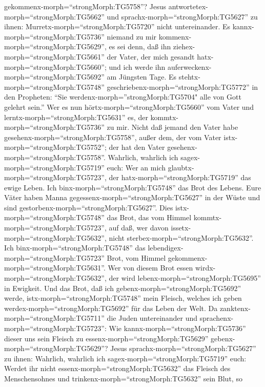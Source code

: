 gekommenx-morph=``strongMorph:TG5758''?  Jesus
antwortetex-morph=``strongMorph:TG5662'' und
sprachx-morph=``strongMorph:TG5627'' zu ihnen:
Murretx-morph=``strongMorph:TG5720'' nicht untereinander. 
Es kannx-morph=``strongMorph:TG5736'' niemand zu mir
kommenx-morph=``strongMorph:TG5629'', es sei denn, daß ihn
ziehex-morph=``strongMorph:TG5661'' der Vater, der mich gesandt
hatx-morph=``strongMorph:TG5660''; und ich werde ihn
auferweckenx-morph=``strongMorph:TG5692'' am Jüngsten Tage.
 Es stehtx-morph=``strongMorph:TG5748''
geschriebenx-morph=``strongMorph:TG5772'' in den Propheten: ``Sie
werdenx-morph=''strongMorph:TG5704" alle von Gott gelehrt sein.'' Wer es
nun hörtx-morph=``strongMorph:TG5660'' vom Vater und
lerntx-morph=``strongMorph:TG5631'' es, der
kommtx-morph=``strongMorph:TG5736'' zu mir.  Nicht daß
jemand den Vater habe gesehenx-morph=``strongMorph:TG5758'', außer dem,
der vom Vater istx-morph=``strongMorph:TG5752''; der hat den Vater
gesehenx-morph=``strongMorph:TG5758''.  Wahrlich, wahrlich
ich sagex-morph=``strongMorph:TG5719'' euch: Wer an mich
glaubtx-morph=``strongMorph:TG5723'', der
hatx-morph=``strongMorph:TG5719'' das ewige Leben.  Ich
binx-morph=``strongMorph:TG5748'' das Brot des Lebens. 
Eure Väter haben Manna gegessenx-morph=``strongMorph:TG5627'' in der
Wüste und sind gestorbenx-morph=``strongMorph:TG5627''. 
Dies istx-morph=``strongMorph:TG5748'' das Brot, das vom Himmel
kommtx-morph=``strongMorph:TG5723'', auf daß, wer davon
issetx-morph=``strongMorph:TG5632'', nicht
sterbex-morph=``strongMorph:TG5632''.  Ich
binx-morph=``strongMorph:TG5748'' das
lebendigex-morph=``strongMorph:TG5723'' Brot, vom Himmel
gekommenx-morph=``strongMorph:TG5631''. Wer von diesem Brot essen
wirdx-morph=``strongMorph:TG5632'', der wird
lebenx-morph=``strongMorph:TG5695'' in Ewigkeit. Und das Brot, daß ich
gebenx-morph=``strongMorph:TG5692'' werde,
istx-morph=``strongMorph:TG5748'' mein Fleisch, welches ich geben
werdex-morph=``strongMorph:TG5692'' für das Leben der Welt.
 Da zanktenx-morph=``strongMorph:TG5711'' die Juden
untereinander und sprachenx-morph=``strongMorph:TG5723'': Wie
kannx-morph=``strongMorph:TG5736'' dieser uns sein Fleisch zu
essenx-morph=``strongMorph:TG5629'' gebenx-morph=``strongMorph:TG5629''?
 Jesus sprachx-morph=``strongMorph:TG5627'' zu ihnen:
Wahrlich, wahrlich ich sagex-morph=``strongMorph:TG5719'' euch: Werdet
ihr nicht essenx-morph=``strongMorph:TG5632'' das Fleisch des
Menschensohnes und trinkenx-morph=``strongMorph:TG5632'' sein Blut, so
